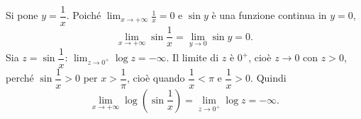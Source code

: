 \documentclass[11pt,a4paper]{article}
\begin{document}
\begin{esempio}
Si pone $y = \dfrac{1}{x}$. Poiché $\displaystyle\lim_{x\to+\infty}\frac{1}{x} = 0$ e $\sin y$ è una funzione continua in $y = 0$,
\[
  \lim_{x\to+\infty}\sin\frac{1}{x} = \lim_{y\to 0}\sin y = 0 .
\]
Sia $z = \sin\dfrac{1}{x}$: $\displaystyle\lim_{z\to 0^+}\log z = -\infty$. Il limite di $z$ è $0^+$, cioè $z \to 0$ con $z > 0$, perché $\sin\dfrac{1}{x} > 0$ per $x > \dfrac{1}{\pi}$, cioè quando $\dfrac{1}{x} < \pi$ e $\dfrac{1}{x} > 0$. Quindi
\[
  \lim_{x\to+\infty}\log\left(\sin\frac{1}{x}\right) = \lim_{z\to 0^+}\log z = -\infty .
\]
\end{esempio}
\end{document}
